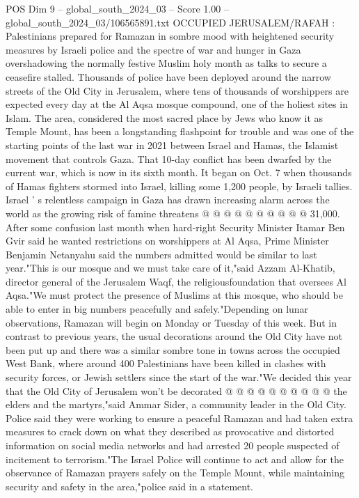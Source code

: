 \begin{textsample}{POS Dim 9 – global\_south\_2024\_03 – Score 1.00 – global\_south\_2024\_03/106565891.txt}  \label{ex:f9_pos_073}
OCCUPIED JERUSALEM/RAFAH : Palestinians prepared for Ramazan in sombre mood with heightened security measures by Israeli police and the spectre of war and hunger in Gaza overshadowing the normally festive Muslim holy month as talks to secure a ceasefire stalled.
Thousands of police have been deployed around the narrow streets of the Old City in Jerusalem, where tens of thousands of worshippers are expected every day at the Al Aqsa mosque compound, one of the holiest sites in Islam.
The area, considered the most sacred place by Jews who know it as Temple Mount, has been a longstanding flashpoint for trouble and was one of the starting points of the last war in 2021 between Israel and Hamas, the Islamist movement that controls Gaza.
That 10-day conflict has been dwarfed by the current war, which is now in its sixth month.
It began on Oct. 7 when thousands of Hamas fighters stormed into Israel, killing some 1,200 people, by Israeli tallies.
Israel ' s relentless campaign in Gaza has drawn increasing alarm across the world as the growing risk of famine threatens @ @ @ @ @ @ @ @ @ @ 31,000.
After some confusion last month when hard-right Security Minister Itamar Ben Gvir said he wanted restrictions on worshippers at Al Aqsa, Prime Minister Benjamin Netanyahu said the numbers admitted would be similar to last year."This is our mosque and we must take care of it,"said Azzam Al-Khatib, director general of the Jerusalem Waqf, the religiousfoundation that oversees Al Aqsa."We must protect the presence of Muslims at this mosque, who should be able to enter in big numbers peacefully and safely."Depending on lunar observations, Ramazan will begin on Monday or Tuesday of this week.
But in contrast to previous years, the usual decorations around the Old City have not been put up and there was a similar sombre tone in towns across the occupied West Bank, where around 400 Palestinians have been killed in clashes with security forces, or Jewish settlers since the start of the war."We decided this year that the Old City of Jerusalem won't be decorated @ @ @ @ @ @ @ @ @ @ the elders and the martyrs,"said Ammar Sider, a community leader in the Old City.
Police said they were working to ensure a peaceful Ramazan and had taken extra measures to crack down on what they described as provocative and distorted information on social media networks and had arrested 20 people suspected of incitement to terrorism."The Israel Police will continue to act and allow for the observance of Ramazan prayers safely on the Temple Mount, while maintaining security and safety in the area,"police said in a statement.

\end{textsample}

